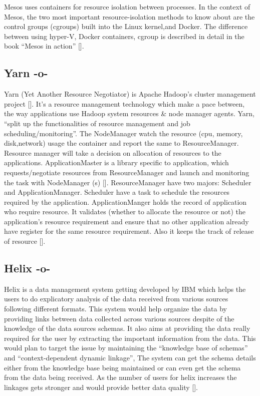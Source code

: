 Mesos uses containers for resource isolation between processes. In the
context of Mesos, the two most important resource-isolation methods to
know about are the control groups (cgroups) built into the Linux
kernel,and Docker. The difference between using hyper-V, Docker
containers, cgroup is described in detail in the book ``Mesos in
action'' [\cite{book-mesos-Ignazio-2016}].




\subsection{Yarn -o-}

Yarn (Yet Another Resource Negotiator) is Apache Hadoop's cluster
management project [\cite{www-cloudera}]. It's a resource management
technology which make a pace between, the way applications use Hadoop
system resources \& node manager agents. Yarn, ``split up the
functionalities of resource management and job
scheduling/monitoring''. The NodeManager watch the resource (cpu,
memory, disk,network) usage the container and report the same to
ResourceManager. Resource manager will take a decision on allocation
of resources to the applications. ApplicationMaster is a library
specific to application, which requests/negotiate resources from
ResourceManager and launch and monitoring the task with NodeManager
(s) [\cite{www-architecture}].  ResourceManager have two majors:
Scheduler and ApplicationManager. Scheduler have a task to schedule
the resources required by the application. ApplicationManger holds the
record of application who require resource. It validates (whether to
allocate the resource or not) the application's resource requirement
and ensure that no other application already have register for the
same resource requirement. Also it keeps the track of release of
resource [\cite{www-HadoopApache}].



\subsection{Helix -o-}

Helix is a data management system getting developed by IBM which helps
the users to do explicatory analysis of the data received from various
sources following different formats. This system would help organize
the data by providing links between data collected across various
sources despite of the knowledge of the data sources schemas. It also
aims at providing the data really required for the user by extracting
the important information from the data. This would plan to target the
issue by maintaining the ``knowledge base of schemas'' and
``context-dependent dynamic linkage'', The system can get the schema
details either from the knowledge base being maintained or can even
get the schema from the data being received. As the number of users
for helix increases the linkages gets stronger and would provide
better data quality [\cite{www-ibm-helix-paper}].


